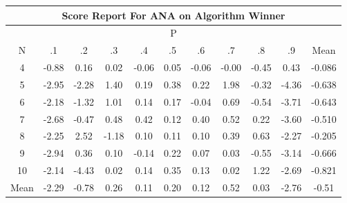 \documentclass[11pt,a4paper]{report}
\begin{document}
\begin{longtable}{ | c || c | c | c | c | c | c | c | c | c || c |}
\hline
\multicolumn{11}{|c|}{ Score Report For ANA on Algorithm Winner} \\
\hline
\multicolumn{11}{|c|}{ P } \\
\hline
N & .1 & .2 & .3 & .4 & .5 & .6 & .7 & .8 & .9 & Mean\\
 \hline
 \hline
 \endhead
  4 &  \cellcolor[HTML]{FFE7E7} -0.88 &  \cellcolor[HTML]{F7F7FF} 0.16 &  \cellcolor[HTML]{FFFFFF} 0.02 &  \cellcolor[HTML]{FFFFFF} -0.06 &  \cellcolor[HTML]{FFFFFF} 0.05 &  \cellcolor[HTML]{FFFFFF} -0.06 &  \cellcolor[HTML]{FFFFFF} -0.00 &  \cellcolor[HTML]{FFF7F7} -0.45 &  \cellcolor[HTML]{F7F7FF} 0.43 & -0.086 \\
  5 &  \cellcolor[HTML]{FFB7B7} -2.95 &  \cellcolor[HTML]{FFC7C7} -2.28 &  \cellcolor[HTML]{DFDFFF} 1.40 &  \cellcolor[HTML]{F7F7FF} 0.19 &  \cellcolor[HTML]{F7F7FF} 0.38 &  \cellcolor[HTML]{F7F7FF} 0.22 &  \cellcolor[HTML]{CFCFFF} 1.98 &  \cellcolor[HTML]{FFF7F7} -0.32 &  \cellcolor[HTML]{FF8F8F} -4.36 & -0.638 \\
  6 &  \cellcolor[HTML]{FFC7C7} -2.18 &  \cellcolor[HTML]{FFDFDF} -1.32 &  \cellcolor[HTML]{E7E7FF} 1.01 &  \cellcolor[HTML]{FFFFFF} 0.14 &  \cellcolor[HTML]{F7F7FF} 0.17 &  \cellcolor[HTML]{FFFFFF} -0.04 &  \cellcolor[HTML]{EFEFFF} 0.69 &  \cellcolor[HTML]{FFEFEF} -0.54 &  \cellcolor[HTML]{FF9F9F} -3.71 & -0.643 \\
  7 &  \cellcolor[HTML]{FFBFBF} -2.68 &  \cellcolor[HTML]{FFF7F7} -0.47 &  \cellcolor[HTML]{EFEFFF} 0.48 &  \cellcolor[HTML]{F7F7FF} 0.42 &  \cellcolor[HTML]{FFFFFF} 0.12 &  \cellcolor[HTML]{F7F7FF} 0.40 &  \cellcolor[HTML]{EFEFFF} 0.52 &  \cellcolor[HTML]{F7F7FF} 0.22 &  \cellcolor[HTML]{FFA7A7} -3.60 & -0.510 \\
  8 &  \cellcolor[HTML]{FFC7C7} -2.25 &  \cellcolor[HTML]{BFBFFF} 2.52 &  \cellcolor[HTML]{FFDFDF} -1.18 &  \cellcolor[HTML]{FFFFFF} 0.10 &  \cellcolor[HTML]{FFFFFF} 0.11 &  \cellcolor[HTML]{FFFFFF} 0.10 &  \cellcolor[HTML]{F7F7FF} 0.39 &  \cellcolor[HTML]{EFEFFF} 0.63 &  \cellcolor[HTML]{FFC7C7} -2.27 & -0.205 \\
  9 &  \cellcolor[HTML]{FFB7B7} -2.94 &  \cellcolor[HTML]{F7F7FF} 0.36 &  \cellcolor[HTML]{FFFFFF} 0.10 &  \cellcolor[HTML]{FFFFFF} -0.14 &  \cellcolor[HTML]{F7F7FF} 0.22 &  \cellcolor[HTML]{FFFFFF} 0.07 &  \cellcolor[HTML]{FFFFFF} 0.03 &  \cellcolor[HTML]{FFEFEF} -0.55 &  \cellcolor[HTML]{FFAFAF} -3.14 & -0.666 \\
  10 &  \cellcolor[HTML]{FFC7C7} -2.14 &  \cellcolor[HTML]{FF8F8F} -4.43 &  \cellcolor[HTML]{FFFFFF} 0.02 &  \cellcolor[HTML]{FFFFFF} 0.14 &  \cellcolor[HTML]{F7F7FF} 0.35 &  \cellcolor[HTML]{FFFFFF} 0.13 &  \cellcolor[HTML]{FFFFFF} 0.02 &  \cellcolor[HTML]{DFDFFF} 1.22 &  \cellcolor[HTML]{FFBFBF} -2.69 & -0.821 \\
 \hline
 \hline
Mean &  \cellcolor[HTML]{FFC7C7} -2.29 &  \cellcolor[HTML]{FFEFEF} -0.78 &  \cellcolor[HTML]{F7F7FF} 0.26 &  \cellcolor[HTML]{FFFFFF} 0.11 &  \cellcolor[HTML]{F7F7FF} 0.20 &  \cellcolor[HTML]{FFFFFF} 0.12 &  \cellcolor[HTML]{EFEFFF} 0.52 &  \cellcolor[HTML]{FFFFFF} 0.03 &  \cellcolor[HTML]{FFB7B7} -2.76 &  \cellcolor[HTML]{FFEFEF} -0.51
\end{longtable}
\end{document}
